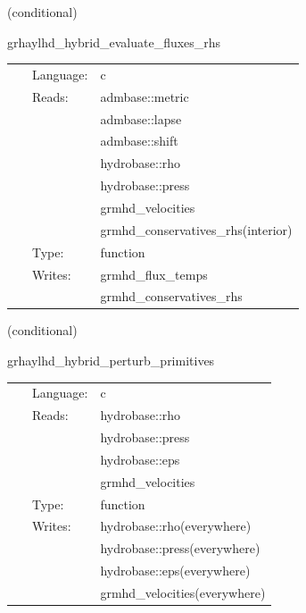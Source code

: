 \vspace{5mm}

   (conditional) 

\hspace{5mm} grhaylhd\_hybrid\_evaluate\_fluxes\_rhs 

\hspace{5mm}{\it hybrid version of grhaylhd\_evaluate\_fluxes\_rhs } 


\hspace{5mm}

 \begin{tabular*}{160mm}{cll} 
~ & Language:  & c \\ 
~ & Reads:  & admbase::metric \\ 
~& ~ &admbase::lapse\\ 
~& ~ &admbase::shift\\ 
~& ~ &hydrobase::rho\\ 
~& ~ &hydrobase::press\\ 
~& ~ &grmhd\_velocities\\ 
~& ~ &grmhd\_conservatives\_rhs(interior)\\ 
~ & Type:  & function \\ 
~ & Writes:  & grmhd\_flux\_temps \\ 
~& ~ &grmhd\_conservatives\_rhs\\ 
\end{tabular*} 


\vspace{5mm}

   (conditional) 

\hspace{5mm} grhaylhd\_hybrid\_perturb\_primitives 

\hspace{5mm}{\it hybrid version of grhaylhd\_perturb\_primitives } 


\hspace{5mm}

 \begin{tabular*}{160mm}{cll} 
~ & Language:  & c \\ 
~ & Reads:  & hydrobase::rho \\ 
~& ~ &hydrobase::press\\ 
~& ~ &hydrobase::eps\\ 
~& ~ &grmhd\_velocities\\ 
~ & Type:  & function \\ 
~ & Writes:  & hydrobase::rho(everywhere) \\ 
~& ~ &hydrobase::press(everywhere)\\ 
~& ~ &hydrobase::eps(everywhere)\\ 
~& ~ &grmhd\_velocities(everywhere)\\ 
\end{tabular*} 


